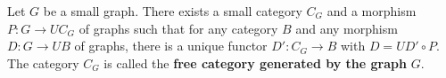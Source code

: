 Let $G$ be a small graph. There exists a small category $C_G$ and a morphism $P: G \rightarrow UC_G$ of graphs such that for any category $B$ and any morphism $D: G \rightarrow UB$ of graphs, there is a unique functor $D': C_G \rightarrow B$ with $D = UD' \circ P$. The category $C_G$ is called the \textbf{free category generated by the graph} $G$.